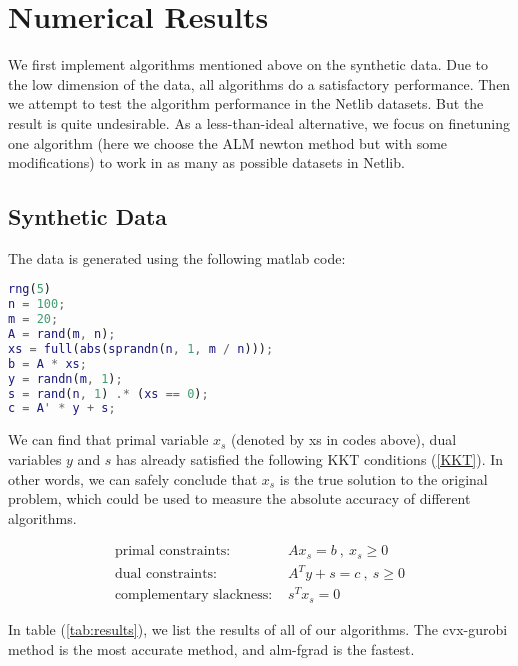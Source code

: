 \documentclass[a4paper]{article}
\begin{document}
\pagebreak

\section{Numerical Results}
We first implement algorithms mentioned above on the synthetic data. Due to the low dimension of the data, all algorithms do a satisfactory performance. Then we attempt to test the algorithm performance in the Netlib datasets. But the result is quite undesirable. As a less-than-ideal alternative, we focus on finetuning one algorithm (here we choose the ALM newton method but with some modifications) to work in as many as possible datasets in Netlib.

\subsection{Synthetic Data}

The data is generated using the following matlab code:

\begin{lstlisting}[language=matlab]
rng(5)
n = 100;
m = 20;
A = rand(m, n);
xs = full(abs(sprandn(n, 1, m / n)));
b = A * xs;
y = randn(m, 1);
s = rand(n, 1) .* (xs == 0);
c = A' * y + s;
\end{lstlisting}

We can find that primal variable $x_s$ (denoted by xs in codes above), dual variables $y$ and $s$ has already satisfied the following KKT conditions (\ref{KKT}). In other words, we can safely conclude that $x_s$ is the true solution to the original problem, which could be used to measure the absolute accuracy of different algorithms. 

\begin{equation}
\begin{aligned}
\textrm{primal constraints: }  & Ax_s=b \ , \  x_s \geq 0 \\
\textrm{dual constraints: } & A^Ty+s=c  \ , \  s \geq 0\\
\textrm{complementary slackness: } &  s^Tx_s=0  
\end{aligned}
\label{KKT}
\end{equation}

In table (\ref{tab:results}), we list the results of all of our algorithms. The cvx-gurobi method is the most accurate method, and alm-fgrad is the fastest.
\end{document}
